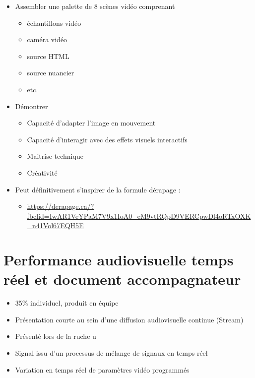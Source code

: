 \documentclass[
  french,
]{book}
\providecommand{\tightlist}{%
  \setlength{\itemsep}{0pt}\setlength{\parskip}{0pt}}
\begin{document}
\begin{itemize}
\tightlist
\item
  Assembler une palette de 8 scènes vidéo comprenant

  \begin{itemize}
  \tightlist
  \item
    échantillons vidéo
  \item
    caméra vidéo
  \item
    source HTML
  \item
    source nuancier
  \item
    etc.
  \end{itemize}
\item
  Démontrer

  \begin{itemize}
  \tightlist
  \item
    Capacité d'adapter l'image en mouvement
  \item
    Capacité d'interagir avec des effets visuels interactifs
  \item
    Maitrise technique
  \item
    Créativité
  \end{itemize}
\item
  Peut définitivement s'inspirer de la formule dérapage :

  \begin{itemize}
  \tightlist
  \item
    \url{https://derapage.ca/?fbclid=IwAR1VeYPaM7V9x1IoA0_eM9vtRQpD9VERCpwDl4oRTxOXK_n41Vol67EQH5E}
  \end{itemize}
\end{itemize}

\hypertarget{sommatif_5}{%
\section{Performance audiovisuelle temps réel et document accompagnateur}\label{sommatif_5}}

\begin{itemize}
\tightlist
\item
  35\% individuel, produit en équipe
\item
  Présentation courte au sein d'une diffusion audiovisuelle continue (Stream)
\item
  Présenté lors de la ruche u
\item
  Signal issu d'un processus de mélange de signaux en temps réel
\item
  Variation en temps réel de paramètres vidéo programmés
\end{itemize}
\end{document}
